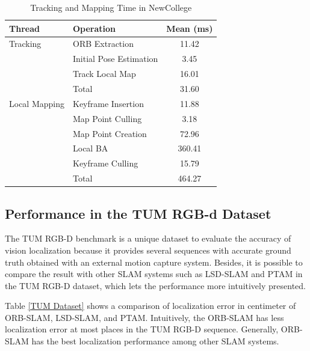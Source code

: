 \documentclass[letterpaper, 10 pt, conference]{ieeeconf}  %
\begin{document}
\begin{table}[h!]
\caption{Tracking and Mapping Time in NewCollege}
\label{Efficiency_Newcollege}
\centering
\begin{tabular}{ l l c } 
\hline
 \hline
 Thread & Operation & Mean (ms) \\ 
 \hline
 Tracking & ORB Extraction & 11.42\\ 
 		  & Initial Pose Estimation & 3.45\\ 
 		  & Track Local Map & 16.01\\ 
 		  & Total & 31.60\\ 
 Local Mapping & Keyframe Insertion & 11.88\\ 
 		       & Map Point Culling & 3.18\\ 
 		       & Map Point Creation & 72.96\\ 
 		       & Local BA & 360.41\\
 		       & Keyframe Culling & 15.79\\
 		       & Total & 464.27\\
\hline
 \hline
\end{tabular}
\end{table}
%
 
\subsection{Performance in the TUM RGB-d Dataset}
The TUM RGB-D benchmark is a unique dataset to evaluate the accuracy of vision localization because it provides several sequences with accurate ground truth obtained with an external motion capture system. Besides, it is possible to compare the result with other SLAM systems such as LSD-SLAM and PTAM in the TUM RGB-D dataset, which lets the performance more intuitively presented.

Table \ref{TUM Dataset} shows a comparison of localization error in centimeter of ORB-SLAM, LSD-SLAM, and PTAM. Intuitively, the ORB-SLAM has less localization error at most places in the TUM RGB-D sequence. Generally, ORB-SLAM has the best localization performance among other SLAM systems.
\end{document}
